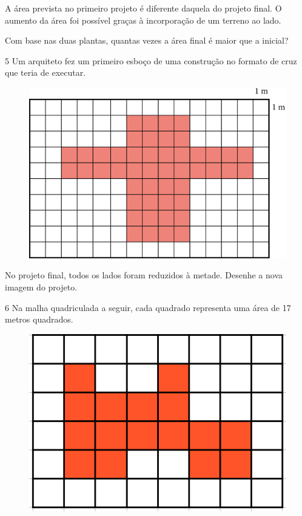 A área prevista no primeiro projeto é diferente daquela do projeto final.
O aumento da área foi possível graças à incorporação de um terreno ao lado.

Com base nas duas plantas, quantas vezes a área final é maior que a inicial?


\pagebreak

\num{5} Um arquiteto fez um primeiro esboço de uma construção no formato de cruz
que teria de executar.

\begin{figure}[htpb!]
\centering
\includegraphics[width=\textwidth]{media/image32.png}
\end{figure}

No projeto final, todos os lados foram reduzidos à metade. Desenhe a nova imagem do projeto.

\begin{mdframed}[linewidth=2pt,linecolor=salmao,roundcorner=2pt]
\vspace{7cm}
\end{mdframed}
\pagebreak

\num{6} Na malha quadriculada a seguir, cada quadrado representa uma área de 17
metros quadrados.

\begin{figure}[htpb!]
\centering
\includegraphics[width=.7\textwidth]{media/image33_.png}
\end{figure}

